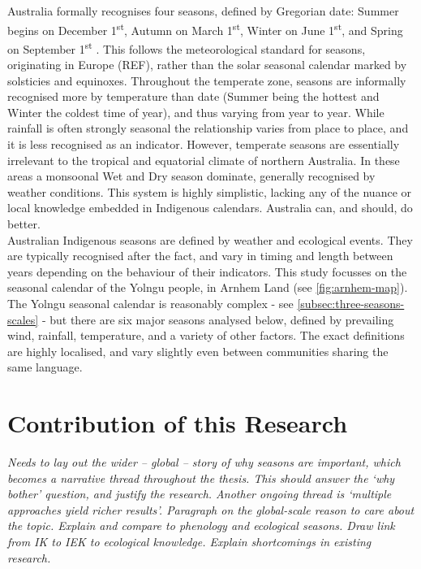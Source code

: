Australia formally recognises four seasons, defined by Gregorian date:
Summer begins on December 1\textsuperscript{st}, Autumn on March
1\textsuperscript{st}, Winter on June 1\textsuperscript{st}, and Spring
on September 1\textsuperscript{st} \citep{wells2013}. This follows the
meteorological standard for seasons, originating in Europe (REF), rather
than the solar seasonal calendar marked by solsticies and equinoxes.
%
Throughout the temperate zone, seasons are informally recognised more by
temperature than date (Summer being the hottest and Winter the coldest time
of year), and thus varying from year to year.  While rainfall is often
strongly  seasonal the relationship varies from place to place, and it is
less recognised as an indicator.
%
However, temperate seasons are essentially irrelevant to the tropical and
equatorial climate of northern Australia.  In these areas a monsoonal Wet
and Dry season dominate, generally recognised by weather conditions.
This system is highly simplistic, lacking any of the nuance or local
knowledge embedded in Indigenous calendars.  Australia can, and should,
do better.\\


Australian Indigenous seasons are defined by weather and ecological events.
They are typically recognised after the fact, and vary in timing and length
between years depending on the behaviour of their indicators.  This study
focusses on the seasonal calendar of the Yolngu people, in Arnhem Land (see
\autoref{fig:arnhem-map}).
%
The Yolngu seasonal calendar is reasonably complex - see
\autoref{subsec:three-seasons-scales} - but there are six major seasons
analysed below, defined by prevailing wind, rainfall, temperature, and a
variety of other factors.  The exact definitions are highly localised,
and vary slightly even between communities sharing the same language.




\section{Contribution of this Research}
\label{sec:intro-contribution}

\textit{
Needs to lay out the wider -- global -- story of why seasons are important,
which becomes a narrative thread throughout the thesis.
This should answer the `why bother' question, and justify the research.
Another ongoing thread is `multiple approaches yield richer results'.
%
Paragraph on the global-scale reason to care about the topic.
Explain and compare to phenology and ecological seasons.
Draw link from IK to IEK to ecological knowledge.
Explain shortcomings in existing research.
}
~\\



